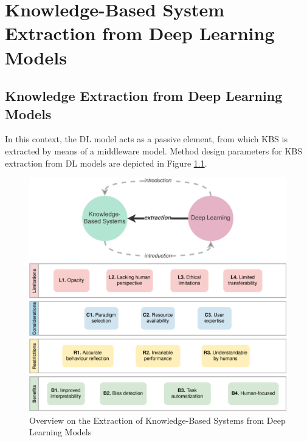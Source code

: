 \chapter{Knowledge-Based System Extraction from Deep Learning Models}
\label{chap:kbsextractiondl}


\section{Knowledge Extraction from Deep Learning Models}\label{6_sec:kbs_extra_dl_method}
In this context, the DL model acts as a passive element, from which KBS is extracted by means of a middleware model. Method design parameters for KBS extraction from DL models are depicted in Figure \ref{fig:kbs_extra_dl_overview}.
\begin{figure}[t]
    \centering
    \includegraphics[width=\linewidth]{6_kbsextractiondl/figures/K_extraction_DL.eps}
    \caption{Overview on the Extraction of Knowledge-Based Systems from Deep Learning Models}
    \label{fig:kbs_extra_dl_overview}
\end{figure}

